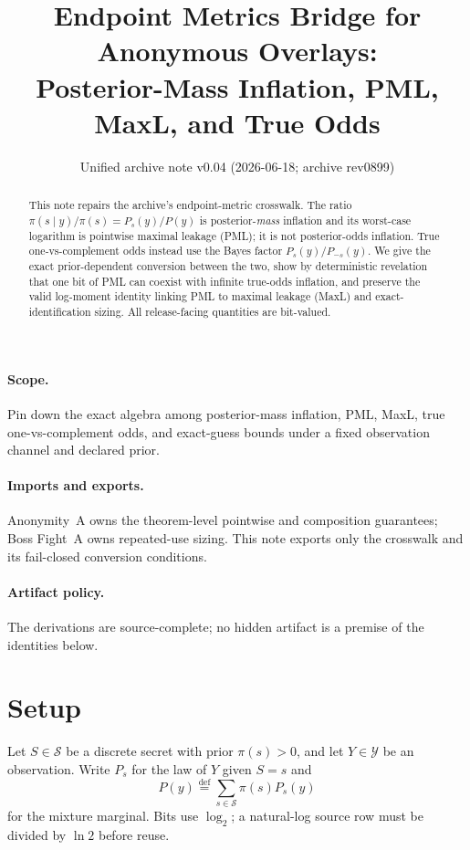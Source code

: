 \documentclass[11pt]{article}
\title{Endpoint Metrics Bridge for Anonymous Overlays:\\ Posterior-Mass Inflation, PML, MaxL, and True Odds}
\author{}
\date{Unified archive note v0.04 (2026-06-18; archive rev0899)}
\newcommand{\defeq}{\stackrel{\mathrm{def}}{=}}
\begin{document}
\maketitle

\begin{abstract}
This note repairs the archive's endpoint-metric crosswalk.
The ratio $\pi(s\mid y)/\pi(s)=P_s(y)/P(y)$ is posterior-\emph{mass} inflation and its worst-case logarithm is pointwise maximal leakage (PML); it is not posterior-odds inflation.
True one-vs-complement odds instead use the Bayes factor $P_s(y)/P_{-s}(y)$.
We give the exact prior-dependent conversion between the two, show by deterministic revelation that one bit of PML can coexist with infinite true-odds inflation, and preserve the valid log-moment identity linking PML to maximal leakage (MaxL) and exact-identification sizing.
All release-facing quantities are bit-valued.
\end{abstract}

\paragraph{Scope.}
Pin down the exact algebra among posterior-mass inflation, PML, MaxL, true one-vs-complement odds, and exact-guess bounds under a fixed observation channel and declared prior.

\paragraph{Imports and exports.}
Anonymity~A owns the theorem-level pointwise and composition guarantees; Boss Fight~A owns repeated-use sizing.\cite{series:oddsinflation,series:bossfightA}
This note exports only the crosswalk and its fail-closed conversion conditions.

\paragraph{Artifact policy.}
The derivations are source-complete; no hidden artifact is a premise of the identities below.\cite{series:artifactpolicy}

\section{Setup}
Let $S\in\mathcal S$ be a discrete secret with prior $\pi(s)>0$, and let $Y\in\mathcal Y$ be an observation.
Write $P_s$ for the law of $Y$ given $S=s$ and
\[
P(y)\defeq\sum_{s\in\mathcal S}\pi(s)P_s(y)
\]
for the mixture marginal.
Bits use $\log_2$; a natural-log source row must be divided by $\ln 2$ before reuse.
\end{document}
